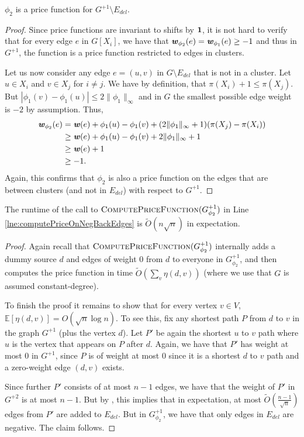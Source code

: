 \begin{claim}
$\phi_2$ is a price function for $G^{+1} \setminus E_{del}$. 
\end{claim}
\begin{proof}
Since price functions are invariant to shifts by $\boldsymbol{1}$, it is not hard to verify that for every edge $e$ in $G[X_i]$, we have that $\boldsymbol{\mathit{w}}_{\phi_2}(e)  = \boldsymbol{\mathit{w}}_{\phi_1}(e) \geq -1$ and thus in $G^{+1}$, the function is a price function restricted to edges in clusters.

Let us now consider any edge $e = (u,v)$ in $G \setminus E_{del}$ that is not in a cluster. Let $u \in X_i$ and $v \in X_j$ for $i \neq j$. We have by definition, that $\pi(X_i) + 1 \leq \pi(X_j)$. But $|\phi_1(v) - \phi_1(u)| \leq 2\|\phi_1 \|_{\infty}$ and in $G$ the smallest possible edge weight is $-2$ by assumption. Thus, 
\begin{align*}
\boldsymbol{\mathit{w}}_{\phi_2}(e) &= \boldsymbol{\mathit{w}}(e) + \phi_1(u) - \phi_1(v) + (2\|\phi_1 \|_{\infty} + 1) (\pi(X_j) - \pi(X_i)) \\
& \geq \boldsymbol{\mathit{w}}(e) + \phi_1(u) - \phi_1(v) + 2\|\phi_1 \|_{\infty} + 1\\
& \geq \boldsymbol{\mathit{w}}(e) +1 \\
&\geq -1.
\end{align*} 
Again, this confirms that $\phi_2$ is also a price function on the edges that are between clusters (and not in $E_{del}$) with respect to $G^{+1}$.
\end{proof}

\begin{claim}\label{clm:finalClaimNegSSSP}
The runtime of the call to $ \textsc{ComputePriceFunction}(G^{+1}_{\phi_2})$ in Line \ref{lne:computePriceOnNegBackEdges} is $\tilde{O}(n \sqrt{n})$ in expectation.
\end{claim}
\begin{proof}
Again recall that  $\textsc{ComputePriceFunction}(G^{+1}_{\phi_2})$ internally adds a dummy source $d$ and edges of weight $0$ from $d$ to everyone in $G^{+1}_{\phi_2}$, and then computes the price function in time $\tilde{O}(\sum_v \eta(d,v))$ (where we use that $G$ is assumed constant-degree).

To finish the proof it remains to show that for every vertex $v \in V$, $\mathbb{E}[\eta(d,v)] = O( \sqrt{n} \log n)$. To see this, fix any shortest path $P$ from $d$ to $v$ in the graph $G^{+1}$ (plus the vertex $d$). Let $P'$ be again the shortest $u$ to $v$ path where $u$ is the vertex that appears on $P$ after $d$. Again, we have that $P'$ has weight at most $0$ in $G^{+1}$, since $P$ is of weight at most $0$ since it is a shortest $d$ to $v$ path and a zero-weight edge $(d,v)$ exists. 

Since further $P'$ consists of at most $n-1$ edges, we have that the weight of $P'$ in $G^{+2}$ is at most $n-1$. But by , this implies that in expectation, at most $\tilde{O}(\frac{n-1}{\sqrt{n}})$ edges from $P'$ are added to $E_{del}$. But in $G^{+1}_{\phi_2}$, we have that only edges in $E_{del}$ are negative. The claim follows.
\end{proof}


